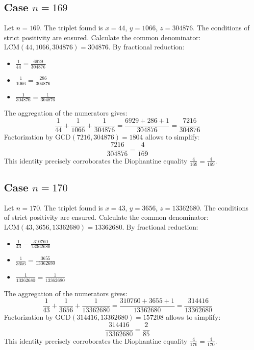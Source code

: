 \documentclass[11pt,a4paper]{article}
\begin{document}
\subsection{Case $n = 169$}
Let $n = 169$. The triplet found is $x = 44$, $y = 1066$, $z = 304876$.
The conditions of strict positivity are ensured.
Calculate the common denominator: $\text{LCM}(44, 1066, 304876) = 304876$.
By fractional reduction:
\begin{itemize}
    \item $\frac{1}{44} = \frac{6929}{304876}$
    \item $\frac{1}{1066} = \frac{286}{304876}$
    \item $\frac{1}{304876} = \frac{1}{304876}$
\end{itemize}
The aggregation of the numerators gives:
$$ \frac{1}{44} + \frac{1}{1066} + \frac{1}{304876} = \frac{6929 + 286 + 1}{304876} = \frac{7216}{304876} $$
Factorization by $\text{GCD}(7216, 304876) = 1804$ allows to simplify:
$$ \frac{7216}{304876} = \frac{4}{169} $$
This identity precisely corroborates the Diophantine equality $\frac{4}{169} = \frac{4}{169}$.

\subsection{Case $n = 170$}
Let $n = 170$. The triplet found is $x = 43$, $y = 3656$, $z = 13362680$.
The conditions of strict positivity are ensured.
Calculate the common denominator: $\text{LCM}(43, 3656, 13362680) = 13362680$.
By fractional reduction:
\begin{itemize}
    \item $\frac{1}{43} = \frac{310760}{13362680}$
    \item $\frac{1}{3656} = \frac{3655}{13362680}$
    \item $\frac{1}{13362680} = \frac{1}{13362680}$
\end{itemize}
The aggregation of the numerators gives:
$$ \frac{1}{43} + \frac{1}{3656} + \frac{1}{13362680} = \frac{310760 + 3655 + 1}{13362680} = \frac{314416}{13362680} $$
Factorization by $\text{GCD}(314416, 13362680) = 157208$ allows to simplify:
$$ \frac{314416}{13362680} = \frac{2}{85} $$
This identity precisely corroborates the Diophantine equality $\frac{4}{170} = \frac{4}{170}$.
\end{document}
